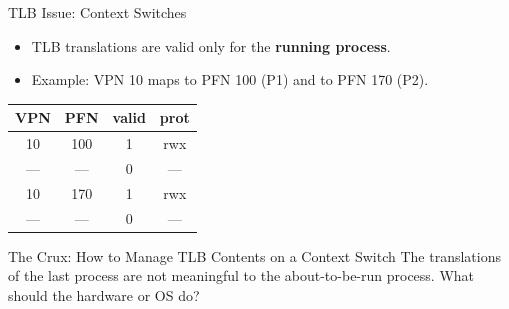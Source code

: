 \begin{frame}{TLB Issue: Context Switches}

\begin{itemize}
    \item TLB translations are valid only for the \textbf{running process}.
    \item Example: VPN 10 maps to PFN 100 (P1) and to PFN 170 (P2).
\end{itemize}

\begin{center}
\footnotesize
\begin{tabular}{cccc}
\toprule
VPN & PFN & valid & prot \\
\midrule
10 & 100 & 1 & rwx \\
--- & --- & 0 & --- \\
10 & 170 & 1 & rwx \\
--- & --- & 0 & --- \\
\bottomrule
\end{tabular}
\end{center}

\begin{block}{The Crux: How to Manage TLB Contents on a Context Switch}
The translations of the last process are not meaningful to the
about-to-be-run process. What should the hardware or OS do?
\end{block}

\end{frame}

